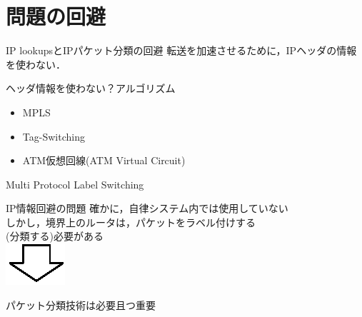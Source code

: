 \documentclass[12pt,dvipdfmx,mathserif,uplatex,aspectratio=32]{beamer}
\begin{document}



\section{問題の回避}

\begin{frame}{IP lookupsとIPパケット分類の回避}
転送を加速させるために，IPヘッダの情報を使わない．\\

\vspace{10mm}

ヘッダ情報を使わない？アルゴリズム
\begin{itemize}
 \item MPLS
 \item Tag-Switching %
 \item ATM仮想回線(ATM Virtual Circuit)
\end{itemize}

\end{frame}


\begin{frame}{Multi Protocol Label Switching}

{\centering
{}

}
\end{frame}

\begin{frame}{IP情報回避の問題}
確かに，自律システム内では使用していない \\
\vspace{3mm}
しかし，境界上のルータは，パケットをラベル付けする \\ \vspace{1mm}(分類する)必要がある \\

\vspace{5mm}
{\centering
\includegraphics{downarrow.eps} \\

}
\vspace{5mm}

{\centering
{\LARGE \color{red}パケット分類技術は必要且つ重要}

}

\end{frame}
\end{document}
